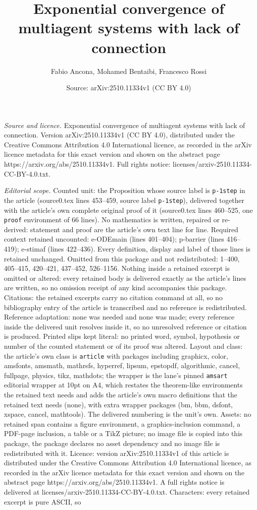 \documentclass[10pt,a4paper]{amsart}
\title[Exponential convergence of multiagent systems with lack of c]{Exponential convergence of multiagent systems with lack of connection}
\author{Fabio Ancona, Mohamed Bentaibi, Francesco Rossi}
\date{Source: arXiv:2510.11334v1 (CC BY 4.0)}
\begin{document}
\maketitle

\noindent\emph{Source and licence.} Exponential convergence of multiagent systems with lack of connection. Version arXiv:2510.11334v1 (CC BY 4.0), distributed under the Creative Commons Attribution 4.0 International licence, as recorded in the arXiv licence metadata for this exact version and shown on the abstract page https://arxiv.org/abs/2510.11334v1. Full rights notice: licenses/arxiv-2510.11334-CC-BY-4.0.txt.\par\smallskip

\noindent\textit{Editorial scope.} Counted unit: the Proposition whose source label is \texttt{p-1step} in the article (source0.tex lines 453--459, source label \texttt{p-1step}), delivered together with the article's own complete original proof of it (source0.tex lines 460--525, one \texttt{proof} environment of 66 lines). No mathematics is written, repaired or re-derived: statement and proof are the article's own text line for line. Required context retained uncounted: e-ODEmain (lines 401--404); p-barrier (lines 416--419); e-stimaf (lines 422--436). Every definition, display and label of those lines is retained unchanged. Omitted from this package and not redistributed: 1--400, 405--415, 420--421, 437--452, 526--1156. Nothing inside a retained excerpt is omitted or altered: every retained body is delivered exactly as the article's lines are written, so no omission receipt of any kind accompanies this package. Citations: the retained excerpts carry no citation command at all, so no bibliography entry of the article is transcribed and no reference is redistributed. Reference adaptation: none was needed and none was made; every reference inside the delivered unit resolves inside it, so no unresolved reference or citation is produced. Printed slips kept literal: no printed word, symbol, hypothesis or number of the counted statement or of its proof was altered. Layout and class: the article's own class is \texttt{article} with packages including graphicx, color, amsfonts, amsmath, mathrsfs, hyperref, lipsum, epstopdf, algorithmic, cancel, fullpage, physics, tikz, mathdots; the wrapper is the lane's pinned \texttt{amsart} editorial wrapper at 10pt on A4, which restates the theorem-like environments the retained text needs and adds the article's own macro definitions that the retained text needs (none), with extra wrapper packages (bm, bbm, dsfont, xspace, cancel, mathtools). The delivered numbering is the unit's own. Assets: no retained span contains a figure environment, a graphics-inclusion command, a PDF-page inclusion, a table or a TikZ picture; no image file is copied into this package, the package declares no asset dependency and no image file is redistributed with it. Licence: version arXiv:2510.11334v1 of this article is distributed under the Creative Commons Attribution 4.0 International licence, as recorded in the arXiv licence metadata for this exact version and shown on the abstract page https://arxiv.org/abs/2510.11334v1. A full rights notice is delivered at licenses/arxiv-2510.11334-CC-BY-4.0.txt. Characters: every retained excerpt is pure ASCII, so 
\end{document}
